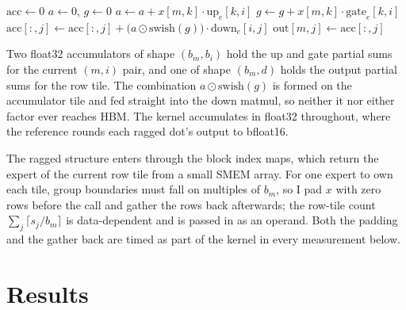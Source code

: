 \documentclass[10pt]{article}
\begin{document}
\begin{algorithm}[H]
\caption{Fused expert MLP, one grid step per innermost iteration.}
\begin{algorithmic}[1]
          \State $\mathrm{acc} \gets 0$
        \EndIf
          \State $a \gets 0$, \; $g \gets 0$
        \EndIf
          \State $a \gets a + x[m, k] \cdot \mathrm{up}_e[k, i]$
          \State $g \gets g + x[m, k] \cdot \mathrm{gate}_e[k, i]$
        \EndIf
          \State $\mathrm{acc}[:, j] \gets \mathrm{acc}[:, j]
                 + \bigl(a \odot \mathrm{swish}(g)\bigr) \cdot \mathrm{down}_e[i, j]$
        \EndIf
          \State $\mathrm{out}[m, j] \gets \mathrm{acc}[:, j]$
        \EndIf
      \EndFor
    \EndFor
  \EndFor
\EndFor
\end{algorithmic}
\end{algorithm}

Two float32 accumulators of shape $(b_m, b_i)$ hold the up and gate partial
sums for the current $(m, i)$ pair, and one of shape $(b_m, d)$ holds the
output partial sums for the row tile. The combination
$a \odot \mathrm{swish}(g)$ is formed on the accumulator tile and fed
straight into the down matmul, so neither it nor either factor ever reaches
HBM. The kernel accumulates in float32 throughout, where the reference
rounds each ragged dot's output to bfloat16.

The ragged structure enters through the block index maps, which return the
expert of the current row tile from a small SMEM array. For one expert to
own each tile, group boundaries must fall on multiples of $b_m$, so I pad
$x$ with zero rows before the call and gather the rows back afterwards; the
row-tile count $\sum_j \lceil s_j / b_m \rceil$ is data-dependent and is
passed in as an operand. Both the padding and the gather back are timed as
part of the kernel in every measurement below.

\section{Results}
\end{document}
